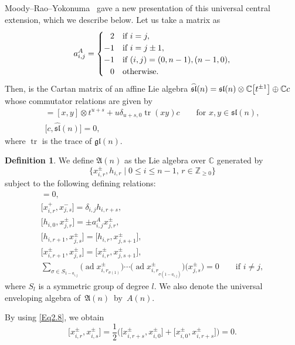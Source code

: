 \documentclass[pdftex]{sigma}
\numberwithin{equation}{section}
\theoremstyle{definition}
\newtheorem{Definition}[Theorem]{Definition}
\DeclareMathOperator{\tr}{tr}
\DeclareMathOperator{\ad}{ad}
\begin{document}
Moody--Rao--Yokonuma~\cite{MRY} gave a new presentation of this universal central extension, which we describe below.
Let us take a matrix  as
\begin{equation*}
a^A_{i,j}=\begin{cases}
\hphantom{-}2&\text{if }i=j,\\
-1&\text{if }i=j\pm1,\\
-1&\text{if }(i,j)=(0,n-1),(n-1,0),\\
\hphantom{-}0&\text{otherwise}.
\end{cases}
\end{equation*}
Then,  is the Cartan matrix of an affine Lie algebra $\smash{\widehat{\mathfrak{sl}}(n)}=\mathfrak{sl}(n)\otimes\mathbb{C}\bigl[t^{\pm1}\bigr]\oplus\mathbb{C}c$ whose commutator relations are given by
\begin{gather*}
[x\otimes t^u,y\otimes t^s]=[x,y]\otimes t^{u+s}+u\delta_{u+s,0}\tr(xy)c \qquad\text{for }x,y\in\mathfrak{sl}(n),\\
\bigl[c,\widehat{\mathfrak{sl}}(n)\bigr]=0,
\end{gather*}
where $\tr$ is the trace of $\mathfrak{gl}(n)$.
\begin{Definition}%
We define $\mathfrak{A}(n)$ as the Lie algebra over $\mathbb{C}$ generated by
\begin{equation*}
\bigl\{x_{i,r}^\pm, h_{i,r}\mid 0\leq i\leq n-1,\,r\in\mathbb{Z}_{\geq0}\bigr\}
\end{equation*}
subject to the following defining relations:
\begin{gather}
[h_{i,r}, h_{j,s}] = 0,\label{Eq2.1}\\
\bigl[x_{i,r}^{+}, x_{j,s}^{-}\bigr] = \delta_{i,j} h_{i, r+s},\label{Eq2.2}\\
\bigl[h_{i,0}, x_{j,r}^{\pm}\bigr] = \pm a^A_{i,j} x_{j,r}^{\pm},\label{Eq2.4}\\
\bigl[h_{i,r+1}, x_{j,s}^{\pm}\bigr] = \bigl[h_{i,r}, x_{j,s+1}^{\pm}\bigr],\label{Eq2.5}\\
\bigl[x_{i, r+1}^{\pm}, x_{j, s}^{\pm}\bigr] = \bigl[x_{i, r}^{\pm}, x_{j, s+1}^{\pm}\bigr],\label{Eq2.8}\\
\sum_{\sigma\in S_{1-a_{i,j}}}\limits\bigl(\ad x_{i,r_{\sigma(1)}}^{\pm}\bigr)\cdots\bigl(\ad x_{i,r_{\sigma(1-a_{i,j})}}^{\pm}\bigr)\bigl(x_{j,s}^{\pm}\bigr)= 0 \qquad\text{if }i \neq j,\label{Eq2.10}
\end{gather}
where $S_l$ is a symmetric group of degree $l$. We also denote the universal enveloping algebra of~$\mathfrak{A}(n)$~by~$A(n)$.
\end{Definition}
By using \eqref{Eq2.8}, we obtain
\begin{equation*}
\bigl[x^\pm_{i,r},x^\pm_{i,s}\bigr]=\frac{1}{2}\bigl(\bigl[x^\pm_{i,r+s},x^\pm_{i,0}\bigr]+\bigl[x^\pm_{i,0},x^\pm_{i,r+s}\bigr]\bigr)=0.%
\end{equation*}
\end{document}
